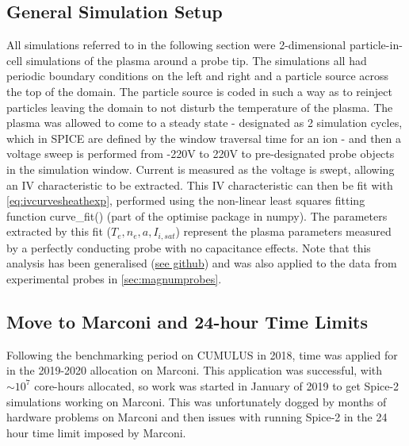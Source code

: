 \documentclass[a4paper, 12pt]{article} %
\begin{document}
\subsection{\label{ssec:sim_setup}General Simulation Setup}
	All simulations referred to in the following section were 2-dimensional particle-in-cell simulations of the plasma around a probe tip.
	The simulations all had periodic boundary conditions on the left and right and a particle source across the top of the domain. 
	The particle source is coded in such a way as to reinject particles leaving the domain to not disturb the temperature of the plasma.
	The plasma was allowed to come to a steady state - designated as 2 simulation cycles, which in SPICE are defined by the window traversal time for an ion - and then a voltage sweep is performed from -220V to 220V to pre-designated probe objects in the simulation window. 
	Current is measured as the voltage is swept, allowing an IV characteristic to be extracted.
	This IV characteristic can then be fit with \cref{eq:ivcurvesheathexp}, performed using the non-linear least squares fitting function curve\_fit() (part of the optimise package in numpy).
	The parameters extracted by this fit ($T_e, n_e, a, I_{i, sat}$) represent the plasma parameters measured by a perfectly conducting probe with no capacitance effects. 
	Note that this analysis has been generalised (\hyperlink{https://github.com/jackleland/flopter}{see github}) and was also applied to the data from experimental probes in \cref{sec:magnumprobes}.

\subsection{\label{ssec:marconi}Move to Marconi and 24-hour Time Limits}
    Following the benchmarking period on CUMULUS in 2018, time was applied for in the 2019-2020 allocation on Marconi. 
    This application was successful, with $\sim10^{7}$ core-hours allocated, so work was started in January of 2019 to get Spice-2 simulations working on Marconi.
    This was unfortunately dogged by months of hardware problems on Marconi and then issues with running Spice-2 in the 24 hour time limit imposed by Marconi.
    
\end{document}
